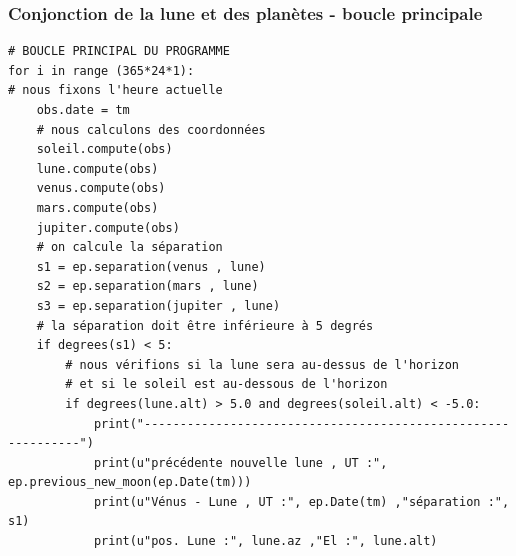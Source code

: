 \documentclass{beamer}
\begin{document}
\begin{frame}
\frametitle{Conjonction de la lune et des planètes - boucle principale}

\begin{verbatim}
# BOUCLE PRINCIPAL DU PROGRAMME
for i in range (365*24*1):
# nous fixons l'heure actuelle
    obs.date = tm
    # nous calculons des coordonnées
    soleil.compute(obs)
    lune.compute(obs)
    venus.compute(obs)
    mars.compute(obs)
    jupiter.compute(obs)
    # on calcule la séparation
    s1 = ep.separation(venus , lune)
    s2 = ep.separation(mars , lune)
    s3 = ep.separation(jupiter , lune)
    # la séparation doit être inférieure à 5 degrés
    if degrees(s1) < 5:
        # nous vérifions si la lune sera au-dessus de l'horizon
        # et si le soleil est au-dessous de l'horizon
        if degrees(lune.alt) > 5.0 and degrees(soleil.alt) < -5.0:
            print("-------------------------------------------------------------")
            print(u"précédente nouvelle lune , UT :", ep.previous_new_moon(ep.Date(tm)))
            print(u"Vénus - Lune , UT :", ep.Date(tm) ,"séparation :", s1)
            print(u"pos. Lune :", lune.az ,"El :", lune.alt)
\end{verbatim}
\end{frame}
\end{document}
